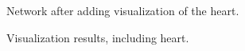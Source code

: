 \documentclass[fleqn,11pt,openany]{book}
\begin{document}
\begin{figure}
\caption{Network after adding visualization of the
heart.}\label{fig:p_e_network_2}
\end{figure}

\begin{figure}
\caption{Visualization results, including
heart.}\label{fig:p_e_results_2}
\end{figure}
\end{document}
